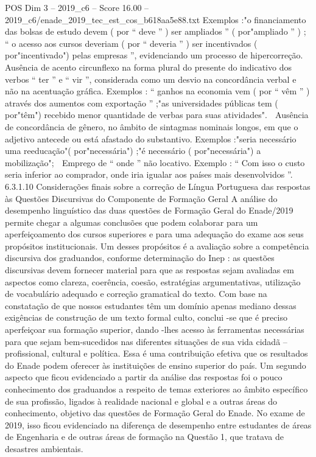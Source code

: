 \begin{textsample}{POS Dim 3 – 2019\_c6 – Score 16.00 – 2019\_c6/enade\_2019\_tec\_est\_cos\_b618aa5e88.txt}
Exemplos :"o financiamento das bolsas de estudo devem ( por “ deve ” ) ser ampliados ” ( por"ampliado ” ) ; “ o acesso aos cursos deveriam ( por “ deveria ” ) ser incentivados ( por"incentivado") pelas empresas ”, evidenciando um processo de hipercorreção.  Ausência de acento circunflexo na forma plural do presente do indicativo dos verbos “ ter ” e “ vir ”, considerada como um desvio na concordância verbal e não na acentuação gráfica.
Exemplos : “ ganhos na economia vem ( por “ vêm ” ) através dos aumentos com exportação ” ;"as universidades públicas tem ( por"têm") recebido menor quantidade de verbas para suas atividades".  Ausência de concordância de gênero, no âmbito de sintagmas nominais longos, em que o adjetivo antecede ou está afastado do substantivo.
Exemplos :"seria necessário uma reeducação"( por"necessária") ;"é necessário ( por"necessária") a mobilização";  Emprego de “ onde ” não locativo.
Exemplo : “ Com isso o custo seria inferior ao comprador, onde iria igualar aos países mais desenvolvidos ”. 6.3.1.10 Considerações finais sobre a correção de Língua Portuguesa das respostas às Questões Discursivas do Componente de Formação Geral A análise do desempenho linguístico das duas questões de Formação Geral do Enade/2019 permite chegar a algumas conclusões que podem colaborar para um aperfeiçoamento dos cursos superiores e para uma adequação do exame aos seus propósitos institucionais.
Um desses propósitos é a avaliação sobre a competência discursiva dos graduandos, conforme determinação do Inep : as questões discursivas devem fornecer material para que as respostas sejam avaliadas em aspectos como clareza, coerência, coesão, estratégias argumentativas, utilização de vocabulário adequado e correção gramatical do texto.
Com base na constatação de que nossos estudantes têm um domínio apenas mediano dessas exigências de construção de um texto formal culto, conclui -se que é preciso aperfeiçoar sua formação superior, dando -lhes acesso às ferramentas necessárias para que sejam bem-sucedidos nas diferentes situações de sua vida cidadã – profissional, cultural e política.
Essa é uma contribuição efetiva que os resultados do Enade podem oferecer às instituições de ensino superior do país.
Um segundo aspecto que ficou evidenciado a partir da análise das respostas foi o pouco conhecimento dos graduandos a respeito de temas exteriores ao âmbito específico de sua profissão, ligados à realidade nacional e global e a outras áreas do conhecimento, objetivo das questões de Formação Geral do Enade.
No exame de 2019, isso ficou evidenciado na diferença de desempenho entre estudantes de áreas de Engenharia e de outras áreas de formação na Questão 1, que tratava de desastres ambientais.

\end{textsample}
